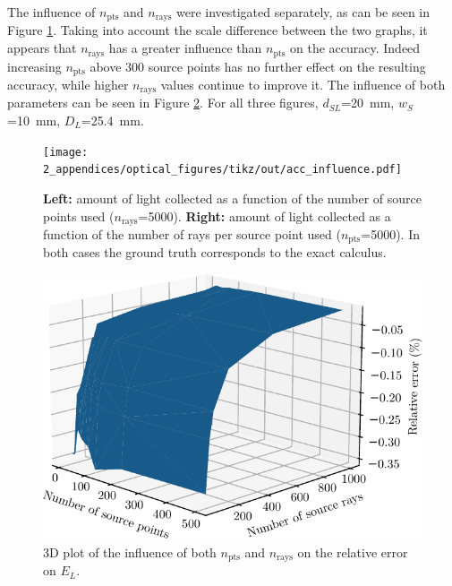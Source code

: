 The influence of $n_\mathrm{pts}$ and $n_\mathrm{rays}$ were investigated separately, as can be seen in Figure \ref{anfig:optics:nn_influence}. Taking into account the scale difference between the two graphs, it appears that $n_\mathrm{rays}$ has a greater influence than $n_\mathrm{pts}$ on the accuracy. Indeed increasing $n_\mathrm{pts}$ above 300 source points has no further effect on the resulting accuracy, while higher $n_\mathrm{rays}$ values continue to improve it. The influence of both parameters can be seen in Figure \ref{anfig:optics:nn_influence_3d}. For all three figures, $d_{SL}$=20~mm, $w_S$=10~mm, $D_L$=25.4~mm.

\begin{figure}
	\centering
	\texttt{[image: 2\_appendices/optical\_figures/tikz/out/acc\_influence.pdf]}
	\caption[Amount of light collected as a function of the number of source points and rays.]{\textbf{Left:} amount of light collected as a function of the number of source points used ($n_\mathrm{rays}$=5000). \textbf{Right:} amount of light collected as a function of the number of rays per source point used ($n_\mathrm{pts}$=5000). In both cases the ground truth corresponds to the exact calculus.}
	\label{anfig:optics:nn_influence}
\end{figure}

\begin{figure}
	\centering
	\includegraphics{2_appendices/optical_figures/nn_influence_3d.pdf}
	\caption{3D plot of the influence of both $n_\mathrm{pts}$ and $n_\mathrm{rays}$ on the relative error on $E_L$.}
	\label{anfig:optics:nn_influence_3d}
\end{figure}

